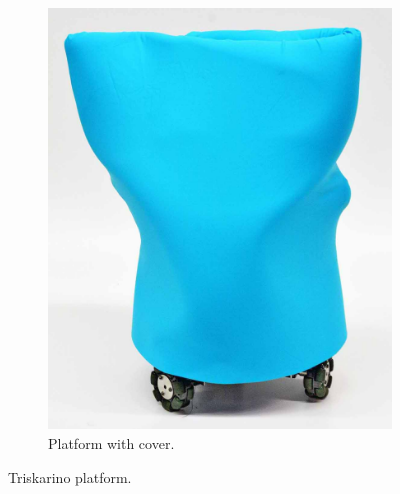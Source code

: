 \begin{figure}
\begin{subfigure}[c]{0.3\textwidth}
	\includegraphics[width=\textwidth]{./Images/Triskar2.jpg}
	\caption{Platform with cover.}
	\label{fig:triskar-cover}
	\end{subfigure}
	\caption{Triskarino platform.}
	\label{fig:robot}
\end{figure} 